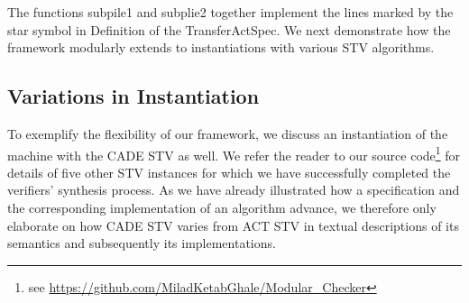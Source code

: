 \documentclass[10pt,conference]{IEEEtran}
\begin{document}
The functions subpile1 and subplie2 together implement the lines marked by the star symbol in Definition of the TransferActSpec. We next demonstrate how the framework modularly extends to instantiations  with various STV algorithms.
\subsection{Variations in Instantiation}
To exemplify the flexibility of our framework, we discuss an instantiation of the machine with the CADE STV as well. We refer the reader to our source code\footnote{ see  \url{https://github.com/MiladKetabGhale/Modular_Checker}} for details of five other STV instances for which we have successfully completed the verifiers' synthesis process. 
As we have already illustrated how a specification and the corresponding implementation of an algorithm advance, we therefore only elaborate on how CADE STV varies from ACT STV in textual descriptions of its  semantics and subsequently its implementations. 
\end{document}
